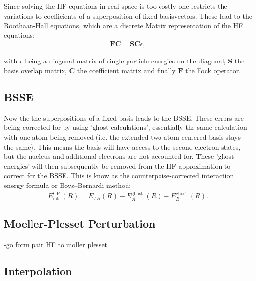 Since solving the \ac{HF} equations in real space is too costly one restricts the variations to coefficients of a superposition of fixed basisvectors. These lead to the Roothaan-Hall equations, which are a discrete Matrix representation of the \ac{HF} equations:
\begin{align}
	\mathbf{F C}=\mathbf{S C} \epsilon,
\end{align} 

with $\epsilon$ being a diagonal matrix of single particle energies on the diagonal, $\mathbf{S}$ the basis overlap matrix, $\mathbf{C}$ the coefficient matrix and finally $\mathbf{F}$ the Fock operator.
\subsection{\ac{BSSE}}
Now the the superpositions of a fixed basis leads to the \ac{BSSE}. These errors are being corrected for by using 'ghost calculations', essentially the same calculation with one atom being removed (i.e. the extended two atom centered basis stays the same). This means the basis will have access to the second electron states, but the nucleus and additional electrons are not accounted for. These 'ghost energies' will then subsequently be removed from the \ac{HF}
approximation to correct for the \ac{BSSE}.
This is know as the counterpoise‐corrected interaction energy formula or Boys–Bernardi method: %
\begin{align}
	E_{\text {int }}^{\text {CP }}(R)=E_{A B}(R)-E_A^{\text {ghost }}(R)-E_B^{\text {ghost }}(R).
\end{align}
\subsection{Moeller-Plesset Perturbation}
-go form pair HF to moller plesset
\subsection{Interpolation}


